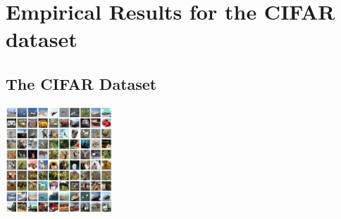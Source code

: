 \documentclass[a4paper]{scrartcl}
\begin{document}
\newpage


\section{Empirical Results for the CIFAR dataset}
\subsection{The CIFAR Dataset}
\begin{center}
\includegraphics[width=4cm]{images/cifar-10.png}
\end{center} 

\newpage
\end{document}
